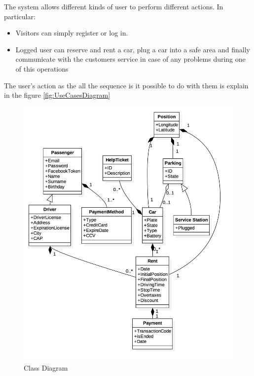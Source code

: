 The system allows different kinds of user to perform different actions. In particular:
\begin{itemize}
	\item Visitors can simply register or log in.
	\item Logged user can reserve and rent a car, plug a car into a safe area and finally communicate with the customers service in case of any problems during one of this operations
\end{itemize}
The user's action as the all the sequence is it possible to do with them is explain in the figure \ref{fig:UseCasesDiagram}
\begin{figure}
   \begin{center}
    \includegraphics[width=\textwidth]{Resources/UML.png}
    \caption{Class Diagram}
   \end{center}
    \label{fig:ClassDiagram}
\end{figure}
\vfill
\vfill
